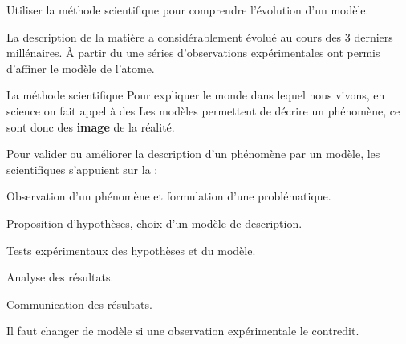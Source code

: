 \teteSndAtom

\vspace*{-36pt}


\begin{objectifs}
  \item Utiliser la méthode scientifique pour comprendre l'évolution d'un modèle.
\end{objectifs}

\begin{contexte}
  La description de la matière a considérablement évolué au cours des 3 derniers millénaires.
  \`A partir du  une séries d'observations expérimentales ont permis d'affiner le modèle de l'atome.
  
\end{contexte}


\begin{doc}{La méthode scientifique}
  Pour expliquer le monde dans lequel nous vivons, en science on fait appel à des  
  Les modèles permettent de décrire un phénomène, ce sont donc des \textbf{image} de la réalité.

  Pour valider ou améliorer la description d'un phénomène par un modèle, les scientifiques s'appuient sur la  :
  \begin{enumeration}
    \item Observation d'un phénomène et formulation d'une problématique.
    \item Proposition d'hypothèses, choix d'un modèle de description.
    \item Tests expérimentaux des hypothèses et du modèle.
    \item Analyse des résultats.
    \item Communication des résultats.
  \end{enumeration}

  \flecheLongue Il faut changer de modèle si une observation expérimentale le contredit.
\end{doc}


